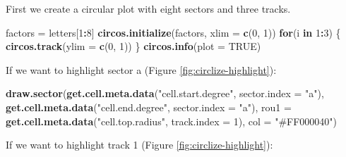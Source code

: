 \documentclass[]{book}
\newenvironment{Shaded}{\begin{snugshade}}{\end{snugshade}}
\newcommand{\KeywordTok}[1]{\textcolor[rgb]{0.13,0.29,0.53}{\textbf{#1}}}
\newcommand{\DataTypeTok}[1]{\textcolor[rgb]{0.13,0.29,0.53}{#1}}
\newcommand{\DecValTok}[1]{\textcolor[rgb]{0.00,0.00,0.81}{#1}}
\newcommand{\StringTok}[1]{\textcolor[rgb]{0.31,0.60,0.02}{#1}}
\newcommand{\OtherTok}[1]{\textcolor[rgb]{0.56,0.35,0.01}{#1}}
\newcommand{\ControlFlowTok}[1]{\textcolor[rgb]{0.13,0.29,0.53}{\textbf{#1}}}
\newcommand{\OperatorTok}[1]{\textcolor[rgb]{0.81,0.36,0.00}{\textbf{#1}}}
\newcommand{\NormalTok}[1]{#1}
\theoremstyle{definition}
\theoremstyle{definition}
\theoremstyle{remark}
\begin{document}
First we create a circular plot with eight sectors and three tracks.

\begin{Shaded}
\begin{Highlighting}[]
\NormalTok{factors =}\StringTok{ }\NormalTok{letters[}\DecValTok{1}\OperatorTok{:}\DecValTok{8}\NormalTok{]}
\KeywordTok{circos.initialize}\NormalTok{(factors, }\DataTypeTok{xlim =} \KeywordTok{c}\NormalTok{(}\DecValTok{0}\NormalTok{, }\DecValTok{1}\NormalTok{))}
\ControlFlowTok{for}\NormalTok{(i }\ControlFlowTok{in} \DecValTok{1}\OperatorTok{:}\DecValTok{3}\NormalTok{) \{}
    \KeywordTok{circos.track}\NormalTok{(}\DataTypeTok{ylim =} \KeywordTok{c}\NormalTok{(}\DecValTok{0}\NormalTok{, }\DecValTok{1}\NormalTok{))}
\NormalTok{\}}
\KeywordTok{circos.info}\NormalTok{(}\DataTypeTok{plot =} \OtherTok{TRUE}\NormalTok{)}
\end{Highlighting}
\end{Shaded}

If we want to highlight sector a (Figure \ref{fig:circlize-highlight}):

\begin{Shaded}
\begin{Highlighting}[]
\KeywordTok{draw.sector}\NormalTok{(}\KeywordTok{get.cell.meta.data}\NormalTok{(}\StringTok{"cell.start.degree"}\NormalTok{, }\DataTypeTok{sector.index =} \StringTok{"a"}\NormalTok{),}
            \KeywordTok{get.cell.meta.data}\NormalTok{(}\StringTok{"cell.end.degree"}\NormalTok{, }\DataTypeTok{sector.index =} \StringTok{"a"}\NormalTok{),}
            \DataTypeTok{rou1 =} \KeywordTok{get.cell.meta.data}\NormalTok{(}\StringTok{"cell.top.radius"}\NormalTok{, }\DataTypeTok{track.index =} \DecValTok{1}\NormalTok{), }
            \DataTypeTok{col =} \StringTok{"#FF000040"}\NormalTok{)}
\end{Highlighting}
\end{Shaded}

If we want to highlight track 1 (Figure \ref{fig:circlize-highlight}):

\begin{Shaded}
\end{Shaded}
\end{document}
